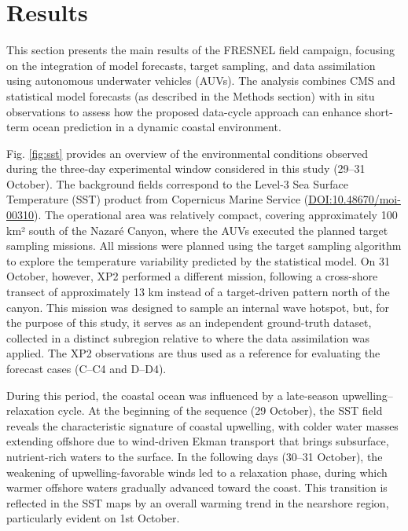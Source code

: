 \section{Results}
\label{sec:results}

This section presents the main results of the FRESNEL field campaign,
focusing on the integration of model forecasts, target sampling, and
data assimilation using autonomous underwater vehicles (AUVs). The
analysis combines CMS and statistical model forecasts (as described
in the Methods section) with in situ observations to assess how the
proposed data-cycle approach can enhance short-term ocean prediction
in a dynamic coastal environment.

Fig. \ref{fig:sst} provides an overview of the environmental
conditions observed during the three-day experimental window
considered in this study (29–31 October). The background fields
correspond to the Level-3 Sea Surface Temperature (SST) product from
Copernicus Marine Service (\url{DOI:10.48670/moi-00310}). The operational area was relatively compact, covering approximately 100 km² south of the Nazaré Canyon, where the AUVs executed the planned target sampling missions. All missions were planned using the target sampling algorithm to explore the temperature variability predicted by the statistical model. On 31 October, however, XP2 performed a different mission, following a cross-shore transect of approximately 13 km instead of a target-driven pattern north of the canyon. This mission was designed to sample an internal wave hotspot, but, for the purpose of this study, it serves as an independent ground-truth dataset, collected in a distinct subregion relative to where the data assimilation was applied. The XP2 observations are thus used as a reference for evaluating the forecast cases (C–C4 and D–D4).

During this period, the coastal ocean was influenced by a late-season upwelling–relaxation cycle. At the beginning of the sequence (29 October), the SST field reveals the characteristic signature of coastal upwelling, with colder water masses extending offshore due to wind-driven Ekman transport that brings subsurface, nutrient-rich waters to the surface. In the following days (30–31 October), the weakening of upwelling-favorable winds led to a relaxation phase, during which warmer offshore waters gradually advanced toward the coast. This transition is reflected in the SST maps by an overall warming trend in the nearshore region, particularly evident on 1st October.


